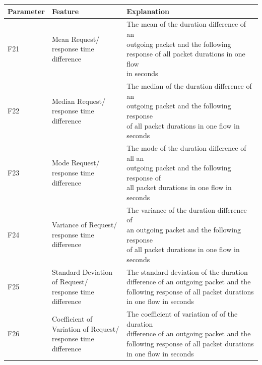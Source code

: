 \begin{center}
\begin{longtable}{ |l|l|l| }
\hline
Parameter & Feature & Explanation \\
\hline
F21 & \makecell{Mean Request/ \\ response time difference} & \makecell{The mean of the duration difference of an \\ outgoing packet and the following \\ response of all packet durations in one flow \\ in seconds} \\
\hline
F22 & \makecell{Median Request/ \\ response time difference} & \makecell{The median of the duration difference of an \\ outgoing packet and the following response \\ of all packet durations in one flow in seconds} \\
\hline
F23 & \makecell{Mode Request/ \\ response time difference} & \makecell{The mode of the duration difference of all an \\ outgoing packet and the following response of \\ all packet durations in one flow in seconds} \\
\hline
F24 & \makecell{Variance of Request/ \\ response time difference} & \makecell{The variance of the duration difference of \\ an outgoing packet and the following response \\ of all packet durations in one flow in seconds} \\
\hline
F25 & \makecell{Standard Deviation \\ of Request/ \\ response time difference} & \makecell{The standard deviation of the duration \\ difference of an outgoing packet and the \\ following response of all packet durations \\ in one flow in seconds} \\
\hline
F26 & \makecell{Coefficient of \\ Variation of Request/ \\ response time difference} & \makecell{The coefficient of variation of of the duration \\ difference of an outgoing packet and the \\ following response of all packet durations \\ in one flow in seconds} \\

\end{longtable}
\end{center}
